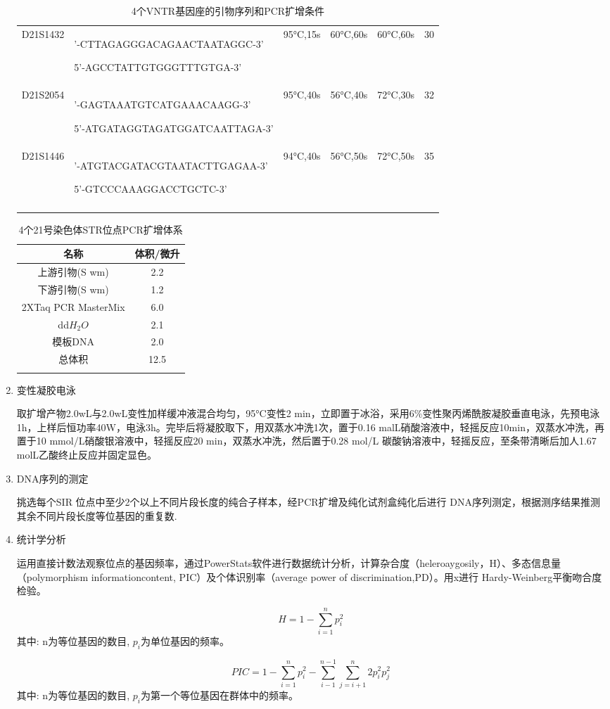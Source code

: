 \documentclass[AutoFakeBold]{LZUThesis}
\begin{document}
\begin{enumerate}
\begin{longtable}{c|p{4.7cm}cccc}
        D21S1432 & \tiny \centering 5'-CTTAGAGGGACAGAACTAATAGGC-3'\par 5'-AGCCTATTGTGGGTTTGTGA-3' & 95°C,15s & 60°C,60s & 60°C,60s & 30 \\
        D21S2054 & \tiny \centering 5'-GAGTAAATGTCATGAAACAAGG-3'\par 5'-ATGATAGGTAGATGGATCAATTAGA-3' & 95°C,40s & 56°C,40s & 72°C,30s & 32 \\
        D21S1446 & \tiny \centering 5'-ATGTACGATACGTAATACTTGAGAA-3'\par 5'-GTCCCAAAGGACCTGCTC-3' & 94°C,40s & 56°C,50s & 72°C,50s & 35 \\
        \bottomrule
        \caption{4个VNTR基因座的引物序列和PCR扩增条件}
        \label{tab:table4} \\
    \end{longtable}
    \begin{longtable}{cc}
        \toprule
        名称 & 体积/微升 \\
        \midrule
        上游引物(S wm) & 2.2 \\
        下游引物(S wm) & 1.2 \\
        2XTaq PCR MasterMix & 6.0 \\
        dd$H_2O$ & 2.1 \\
        模板DNA & 2.0 \\
        总体积 & 12.5 \\
        \bottomrule
        \caption{4个21号染色体STR位点PCR扩增体系}
        \label{tab:table5} \\
    \end{longtable}
    \item 变性凝胶电泳\par
    取扩增产物2.0wL与2.0wL变性加样缓冲液混合均匀，95°C变性2 min，立即置于冰浴，采用6\%变性聚丙烯酰胺凝胶垂直电泳，先预电泳1h，上样后恒功率40W，电泳3h。完毕后将凝胶取下，用双蒸水冲洗1次，置于0.16 malL硝酸溶液中，轻摇反应10min，双蒸水冲洗，再置于10 mmol/L硝酸银溶液中，轻摇反应20 min，双蒸水冲洗，然后置于0.28 mol/L 碳酸钠溶液中，轻摇反应，至条带清晰后加人1.67 molL乙酸终止反应并固定显色。\par
    \item DNA序列的测定\par
    挑选每个SIR 位点中至少2个以上不同片段长度的纯合子样本，经PCR扩增及纯化试剂盒纯化后进行 DNA序列测定，根据测序结果推测其余不同片段长度等位基因的重复数.\par
    \item 统计学分析\par
    运用直接计数法观察位点的基因频率，通过PowerStats软件进行数据统计分析，计算杂合度（heleroaygosily，H）、多态信息量（polymorphism informationcontent, PIC）及个体识别率（average power of discrimination,PD）。用x进行 Hardy-Weinberg平衡吻合度检验。\par
    $$
    H = 1 - \sum_{i=1}^{n}p_i^2
    $$
    其中: n为等位基因的数目, $p_i$为单位基因的频率。\par
    $$
    PIC = 1 - \sum_{i=1}^{n}p_i^2 - \sum_{i-1}^{n-1}\sum_{j=i+1}^{n}2p_i^2p_j^2
    $$
    其中: n为等位基因的数目, $p_i$为第一个等位基因在群体中的频率。\par


\end{enumerate}
\end{document}
